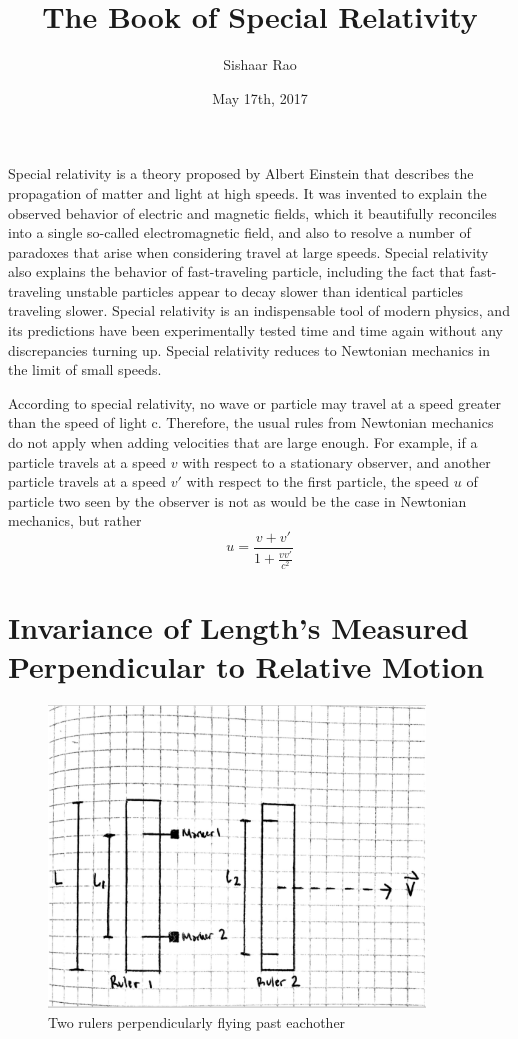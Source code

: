 \documentclass{article}
\title{The Book of Special Relativity}
\date{May 17th, 2017}
\author{Sishaar Rao}
\begin{document}
\maketitle
\newpage
{}

Special relativity is a theory proposed by Albert Einstein that describes the propagation of matter and light at high speeds. It was invented to explain the observed behavior of electric and magnetic fields, which it beautifully reconciles into a single so-called electromagnetic field, and also to resolve a number of paradoxes that arise when considering travel at large speeds. Special relativity also explains the behavior of fast-traveling particle, including the fact that fast-traveling unstable particles appear to decay slower than identical particles traveling slower. Special relativity is an indispensable tool of modern physics, and its predictions have been experimentally tested time and time again without any discrepancies turning up. Special relativity reduces to Newtonian mechanics in the limit of small speeds.

\vspace{5mm}

According to special relativity, no wave or particle may travel at a speed greater than the speed of light c. Therefore, the usual rules from Newtonian mechanics do not apply when adding velocities that are large enough. For example, if a particle travels at a speed \( v \) with respect to a stationary observer, and another particle travels at a speed \( v' \)  with respect to the first particle, the speed \( u \) of particle two seen by the observer is not  as would be the case in Newtonian mechanics, but rather
\[
  u = \frac{v + v'}{1 + \frac{vv'}{c^2}}
\]

\newpage
\section{Invariance of Length’s Measured Perpendicular to Relative Motion}

\begin{figure}[!htb]
  \centering
  \includegraphics[width=100mm]{sticks}\par
  \caption{Two rulers perpendicularly flying past eachother}
\end{figure}
\end{document}
